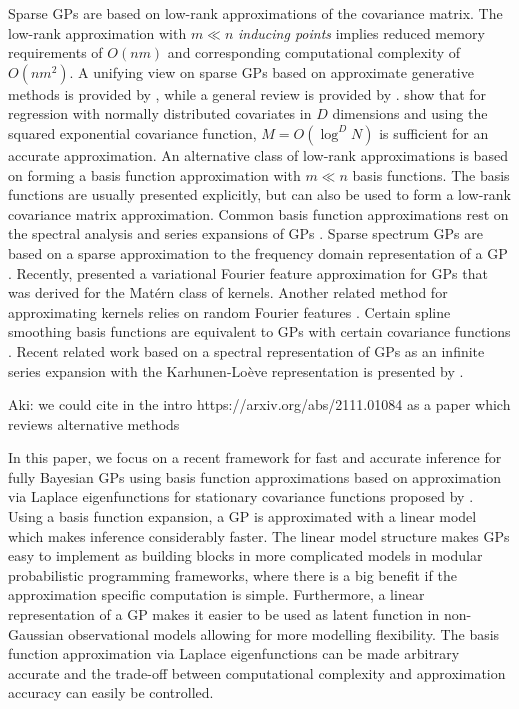 Sparse GPs are based on low-rank approximations of the covariance matrix. The low-rank approximation with $m \ll n$ {\it inducing points} implies reduced memory requirements of $O(nm)$ and corresponding computational complexity of $O(nm^2)$. A unifying view on sparse GPs based on approximate generative methods is provided by \citet{quinonero2005unifying}, while a general review is provided by \citet{rasmussen2006gaussian}. \citet{Burt+Rasmussen+vanderWilk:2019} show that for regression with normally distributed covariates in $D$ dimensions and using the squared exponential covariance function, $M=O(\log^DN)$ is sufficient for an accurate approximation.
An alternative class of low-rank approximations is based on forming a basis function approximation with $m \ll n$ basis functions. The basis functions are usually presented explicitly, but can also be used to form a low-rank covariance matrix approximation. Common basis function approximations rest on the spectral analysis and series expansions of GPs \citep{loeve1977probability,trees1968detection,adler1981geometry,cramer2013stationary}. Sparse spectrum GPs are based on a sparse approximation to the frequency domain representation of a GP \citep{lazaro2010sparse,quia2010sparse,gal2015improving}. Recently, \citet{hensman2017variational} presented a variational Fourier feature approximation for GPs that was derived for the Mat{\'e}rn class of kernels. Another related method for approximating kernels relies on random Fourier features  \citep{rahimi2008random,rahimi2009weighted}. Certain spline smoothing basis functions are equivalent to GPs with certain covariance functions \citep{wahba1990spline,Furrer+Nychka:2007}. Recent related work based on a spectral representation of GPs as an infinite series expansion with the Karhunen-Loève representation \citep[see, e.g.,][]{grenander1981abstract} is presented by \citet{JSSv090i10}.

{\color{blue} Aki: we could cite in the intro https://arxiv.org/abs/2111.01084 as a paper which
reviews alternative methods}

In this paper, we focus on a recent framework for fast and accurate inference for fully Bayesian GPs using basis function approximations based on approximation via Laplace eigenfunctions for stationary covariance functions proposed by \citet{solin2018hilbert}. Using a basis function expansion, a GP is approximated with a linear model which makes inference considerably faster. The linear model structure makes GPs easy to implement as building blocks in more complicated models in modular probabilistic programming frameworks, where there is a big benefit if the approximation specific computation is simple. Furthermore, a linear representation of a GP makes it easier to be used as latent function in non-Gaussian observational models allowing for more modelling flexibility. The basis function approximation via Laplace eigenfunctions can be made arbitrary accurate and the trade-off between computational complexity and approximation accuracy can easily be controlled.

